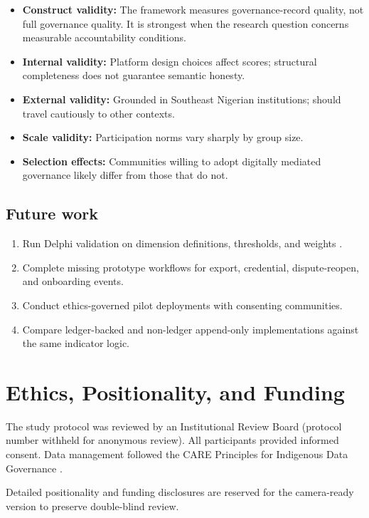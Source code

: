 \documentclass[sigconf,anonymous]{acmart}
\begin{document}
\begin{itemize}
\item \textbf{Construct validity:} The framework measures governance-record quality, not full governance quality. It is strongest when the research question concerns measurable accountability conditions.
\item \textbf{Internal validity:} Platform design choices affect scores; structural completeness does not guarantee semantic honesty.
\item \textbf{External validity:} Grounded in Southeast Nigerian institutions; should travel cautiously to other contexts.
\item \textbf{Scale validity:} Participation norms vary sharply by group size.
\item \textbf{Selection effects:} Communities willing to adopt digitally mediated governance likely differ from those that do not.
\end{itemize}

\subsection{Future work}

\begin{enumerate}
\item Run Delphi validation on dimension definitions, thresholds, and weights \cite{quyen2014}.
\item Complete missing prototype workflows for export, credential, dispute-reopen, and onboarding events.
\item Conduct ethics-governed pilot deployments with consenting communities.
\item Compare ledger-backed and non-ledger append-only implementations against the same indicator logic.
\end{enumerate}

\section{Ethics, Positionality, and Funding}

The study protocol was reviewed by an Institutional Review Board (protocol number withheld for anonymous review). All participants provided informed consent. Data management followed the CARE Principles for Indigenous Data Governance \cite{carroll2020}.

Detailed positionality and funding disclosures are reserved for the camera-ready version to preserve double-blind review.
\end{document}
